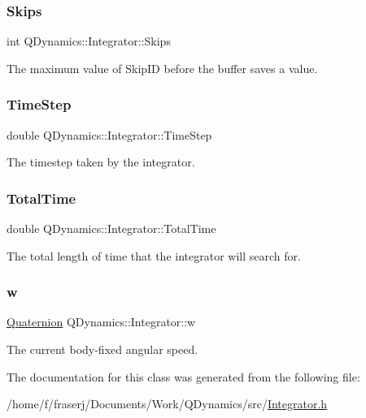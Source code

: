 \subsubsection{\texorpdfstring{Skips}{Skips}}
{\footnotesize\ttfamily int Q\+Dynamics\+::\+Integrator\+::\+Skips\hspace{0.3cm}{\ttfamily [private]}}



The maximum value of Skip\+ID before the buffer saves a value. 

\mbox{\label{classQDynamics_1_1Integrator_a9b850dd4b29118e44b0183409db0a983}} 
\subsubsection{\texorpdfstring{Time\+Step}{TimeStep}}
{\footnotesize\ttfamily double Q\+Dynamics\+::\+Integrator\+::\+Time\+Step\hspace{0.3cm}{\ttfamily [protected]}}



The timestep taken by the integrator. 

\mbox{\label{classQDynamics_1_1Integrator_addfb67b6faa62d88bc7234d5496aeaf9}} 
\subsubsection{\texorpdfstring{Total\+Time}{TotalTime}}
{\footnotesize\ttfamily double Q\+Dynamics\+::\+Integrator\+::\+Total\+Time\hspace{0.3cm}{\ttfamily [protected]}}



The total length of time that the integrator will search for. 

\mbox{\label{classQDynamics_1_1Integrator_a0241b2e2c87418323330999d1f8e12d0}} 
\subsubsection{\texorpdfstring{w}{w}}
{\footnotesize\ttfamily \hyperlink{classQDynamics_1_1Quaternion}{Quaternion} Q\+Dynamics\+::\+Integrator\+::w\hspace{0.3cm}{\ttfamily [protected]}}



The current body-\/fixed angular speed. 



The documentation for this class was generated from the following file\+:\begin{DoxyCompactItemize}
\item 
/home/f/fraserj/\+Documents/\+Work/\+Q\+Dynamics/src/\hyperlink{Integrator_8h}{Integrator.\+h}\end{DoxyCompactItemize}
